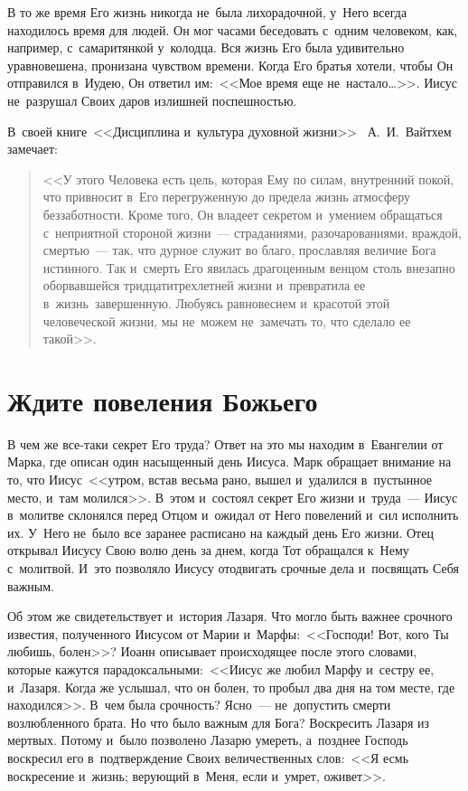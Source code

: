 \documentclass[12pt,article,a4paper,fittopage]{ncc}
\begin{document}
\begin{multicols}{2}
\pagestyle{lheadings}

В то же время Его жизнь никогда не~была лихорадочной, у~Него всегда находилось время для людей. Он мог часами беседовать с~одним человеком, как, например, с~самаритянкой у~колодца. Вся жизнь Его была удивительно уравновешена, пронизана чувством времени. Когда Его братья хотели, чтобы Он отправился в~Иудею, Он ответил им:\ <<Мое время еще не~настало\ldots{}>>. Иисус не~разрушал Своих даров излишней поспешностью. 

В~своей книге\ <<Дисциплина и~культура духовной жизни>> \ А.~И.~Вайтхем замечает:
\begin{quote}
<<У этого Человека есть цель, которая Ему по силам, внутренний покой, что привносит в~Его перегруженную до предела жизнь атмосферу беззаботности. Кроме того, Он владеет секретом и~умением обращаться с~неприятной стороной жизни~--- страданиями, разочарованиями, враждой, смертью~--- так, что дурное служит во благо, прославляя величие Бога истинного. Так и~смерть Его явилась драгоценным венцом столь внезапно оборвавшейся тридцатитрехлетней жизни и~превратила ее в~жизнь\ \glqq завершенную\grqq{}. Любуясь равновесием и~красотой этой человеческой жизни, мы не~можем не~замечать то, что сделало ее такой>>.
\end{quote} 

\section*{Ждите повеления Божьего}

В чем же все-таки секрет Его труда? Ответ на это мы находим в~Евангелии от Марка, где описан один насыщенный день Иисуса. Марк обращает внимание на то, что Иисус\ <<утром, встав весьма рано, вышел и~удалился в~пустынное место, и~там молился>>. В~этом и~состоял секрет Его жизни и~труда~--- Иисус в~молитве склонялся перед Отцом  и~ожидал от Него повелений и~сил исполнить их. У~Него не~было все заранее расписано на каждый день Его жизни. Отец открывал Иисусу Свою волю день за днем, когда Тот обращался к~Нему с~молитвой. И~это позволяло Иисусу отодвигать срочные дела и~посвящать Себя важным.

Об этом же свидетельствует и~история Лазаря. Что могло быть важнее срочного известия, полученного Иисусом от Марии и~Марфы:\ <<Господи! Вот, кого Ты любишь, болен>>? Иоанн описывает происходящее после этого словами, которые кажутся парадоксальными:\ <<Иисус же любил Марфу и~сестру ее, и~Лазаря. Когда же услышал, что он болен, то пробыл два дня на том месте, где находился>>. В~чем была срочность? Ясно~--- не~допустить смерти возлюбленного брата. Но что было важным для Бога? Воскресить Лазаря из мертвых. Потому и~было позволено Лазарю умереть, а~позднее Господь воскресил его в~подтверждение Своих величественных слов:\ <<Я есмь воскресение и~жизнь; верующий в~Меня, если и~умрет, оживет>>.


\end{multicols}
\end{document}
